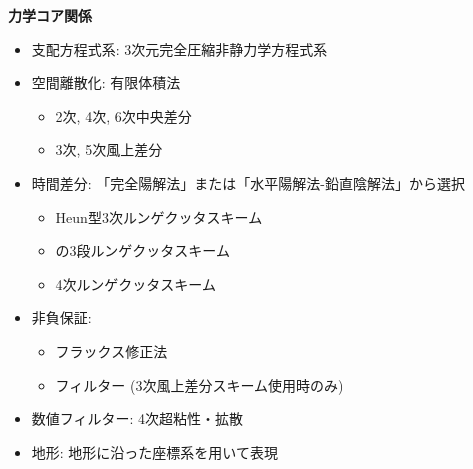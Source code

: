 {\bf 力学コア関係}
\begin{itemize}
 \item 支配方程式系: 3次元完全圧縮非静力学方程式系
 \item 空間離散化: 有限体積法 
    \begin{itemize}
      \item 2次, 4次, 6次中央差分
      \item 3次, 5次風上差分
    \end{itemize}
 \item 時間差分: 「完全陽解法」または「水平陽解法-鉛直陰解法」から選択
    \begin{itemize}
      \item Heun型3次ルンゲクッタスキーム
      \item \citet{Wicker_2002}の3段ルンゲクッタスキーム
      \item 4次ルンゲクッタスキーム
    \end{itemize}
 \item 非負保証:
    \begin{itemize}
      \item フラックス修正法 \citep[Flux Corrected Transport, FCT; ][]{zalesak_1979}
      \item \citet{Koren_1993}フィルター  (3次風上差分スキーム使用時のみ)
    \end{itemize}
 \item 数値フィルター: 4次超粘性・拡散
 \item 地形: 地形に沿った座標系を用いて表現
\end{itemize}

